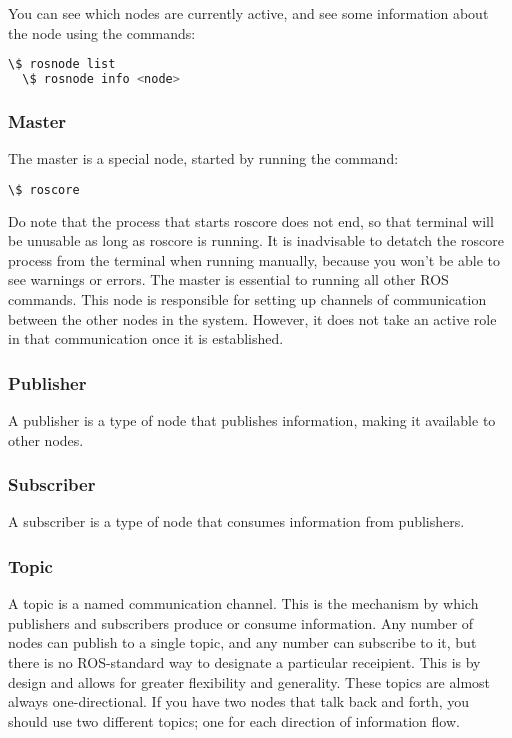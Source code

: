 You can see which nodes are currently active, and see some information about the node using the commands:

\begin{lstlisting}[language=bash]
  \$ rosnode list
  \$ rosnode info <node>
\end{lstlisting}

\subsubsection{Master}

The master is a special node, started by running the command:

\begin{lstlisting}[language=bash]
  \$ roscore
\end{lstlisting}

Do note that the process that starts roscore does not end, so that terminal will be unusable as long as roscore is running. It is inadvisable to detatch the roscore process from the terminal when running manually, because you won't be able to see warnings or errors. The master is essential to running all other ROS commands. This node is responsible for setting up channels of communication between the other nodes in the system. However, it does not take an active role in that communication once it is established.

\subsubsection{Publisher}

A publisher is a type of node that publishes information, making it available to other nodes.

\subsubsection{Subscriber}

A subscriber is a type of node that consumes information from publishers.

\subsubsection{Topic}

A topic is a named communication channel. This is the mechanism by which publishers and subscribers produce or consume information. Any number of nodes can publish to a single topic, and any number can subscribe to it, but there is no ROS-standard way to designate a particular receipient. This is by design and allows for greater flexibility and generality. These topics are almost always one-directional. If you have two nodes that talk back and forth, you should use two different topics; one for each direction of information flow.

